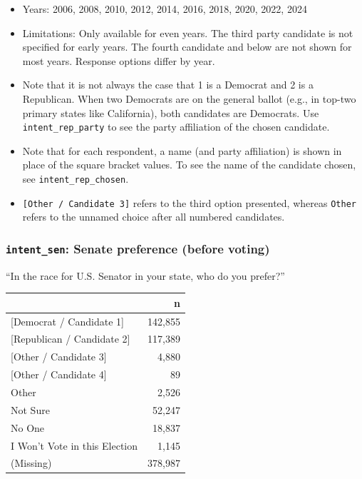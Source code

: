 \documentclass[10pt,article,oneside]{memoir}
\begin{document}
\begin{itemize}
\tightlist
\item
  Years: 2006, 2008, 2010, 2012, 2014, 2016, 2018, 2020, 2022, 2024
\item
  Limitations: Only available for even years. The third party candidate
  is not specified for early years. The fourth candidate and below are
  not shown for most years. Response options differ by year.
\item
  Note that it is not always the case that 1 is a Democrat and 2 is a
  Republican. When two Democrats are on the general ballot (e.g., in
  top-two primary states like California), both candidates are
  Democrats. Use \texttt{intent\_rep\_party} to see the party
  affiliation of the chosen candidate.
\item
  Note that for each respondent, a name (and party affiliation) is shown
  in place of the square bracket values. To see the name of the
  candidate chosen, see \texttt{intent\_rep\_chosen}.
\item
  \texttt{{[}Other\ /\ Candidate\ 3{]}} refers to the third option
  presented, whereas \texttt{Other} refers to the unnamed choice after
  all numbered candidates.
\end{itemize}

\subsubsection{\texorpdfstring{\texttt{intent\_sen}: Senate preference
(before
voting)}{intent\_sen: Senate preference (before voting)}}\label{intent_sen-senate-preference-before-voting}

``In the race for U.S. Senator in your state, who do you prefer?''

\begin{table}[H]
\centering
\begin{tabular}[t]{lr}
\toprule
 & n\\
\midrule
{}{[Democrat / Candidate 1]} & 142,855\\
{}{[Republican / Candidate 2]} & 117,389\\
{}{[Other / Candidate 3]} & 4,880\\
{}{[Other / Candidate 4]} & 89\\
Other & 2,526\\
Not Sure & 52,247\\
No One & 18,837\\
I Won't Vote in this Election & 1,145\\
(Missing) & 378,987\\
\bottomrule
\end{tabular}
\end{table}
\end{document}
